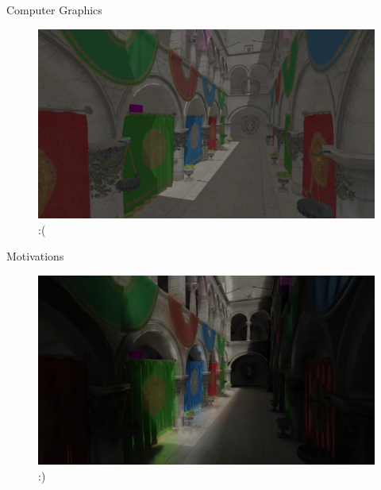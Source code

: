 \documentclass[10pt]{beamer}
\begin{document}
\begin{frame}{Computer Graphics}

      \begin{figure}
        \includegraphics[width=\textwidth]{gi_off.png}
        :(
      \end{figure}
    \end{frame} \begin{frame}{Motivations}
      \begin{figure}
        \includegraphics[width=\textwidth]{gi_on.png}
        :)
      \end{figure}
\end{frame}
\end{document}
